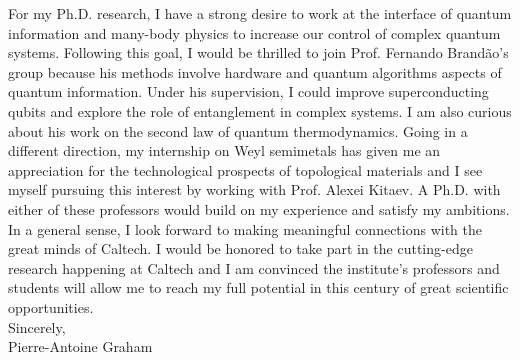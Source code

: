 \documentclass[12pt]{article}
\begin{document}
For my Ph.D. research, I have a strong desire to work at the interface of quantum information and many-body physics to increase our control of complex quantum systems.  Following this goal, I would be thrilled to join Prof. Fernando Brandão's group because his methods involve hardware and quantum algorithms aspects of quantum information. Under his supervision, I could improve superconducting qubits and explore the role of entanglement in complex systems. I am also curious about his work on the second law of quantum thermodynamics. Going in a different direction, my internship on Weyl semimetals has given me an appreciation for the technological prospects of topological materials and I see myself pursuing this interest by working with Prof. Alexei Kitaev. A Ph.D. with either of these professors would build on my experience and satisfy my ambitions.\\[0.2cm]

In a general sense, I look forward to making meaningful connections with the great minds of Caltech. I would be honored to take part in the cutting-edge research happening at Caltech and I am convinced the institute's professors and students will allow me to reach my full potential in this century of great scientific opportunities.\\

Sincerely,\\
Pierre-Antoine Graham
\end{document}
